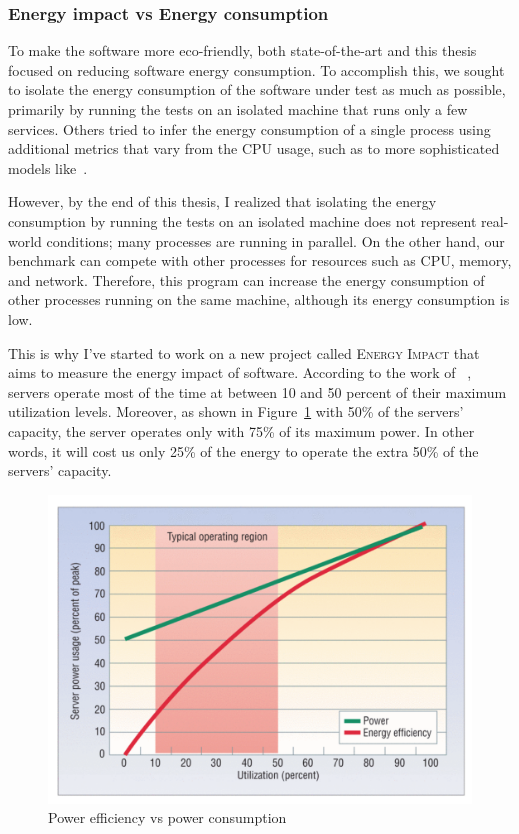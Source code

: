 \subsubsection{Energy impact vs Energy consumption}
To make the software more eco-friendly, both state-of-the-art and this thesis focused on reducing software energy consumption. To accomplish this, we sought to isolate the energy consumption of the software under test as much as possible, primarily by running the tests on an isolated machine that runs only a few services. Others tried to infer the energy consumption of a single process using additional metrics that vary from the CPU usage, such as \cite{noureddine-issta-2016} to more sophisticated models like~\cite{fieni2020smartwatts,fieni2021selfwatts}.

However, by the end of this thesis, I realized that isolating the energy consumption by running the tests on an isolated machine does not represent real-world conditions; many processes are running in parallel. On the other hand, our benchmark can compete with other processes for resources such as CPU, memory, and network. Therefore, this program can increase the energy consumption of other processes running on the same machine, although its energy consumption is low.

This is why I've started to work on a new project called \textsc{Energy Impact} that aims to measure the energy impact of software.
According to the work of \citeauthor{barroso2007case}~\cite{barroso2007case}, servers operate most of the time at between 10 and 50 percent of their maximum utilization levels. Moreover, as shown in Figure~\ref{fig:soa_energy_efficiency} with 50\% of the servers' capacity, the server operates only with  75\% of its maximum power. In other words, it will cost us only 25\% of the energy to operate the extra 50\% of the servers' capacity.

\begin{figure}[!h]
      \centering
      \includegraphics[width=0.9\linewidth,keepaspectratio]{chapters/soa_energy_efficiency}
      \caption{Power efficiency vs power consumption\cite{barroso2007case}}
      \label{fig:soa_energy_efficiency}
\end{figure}

